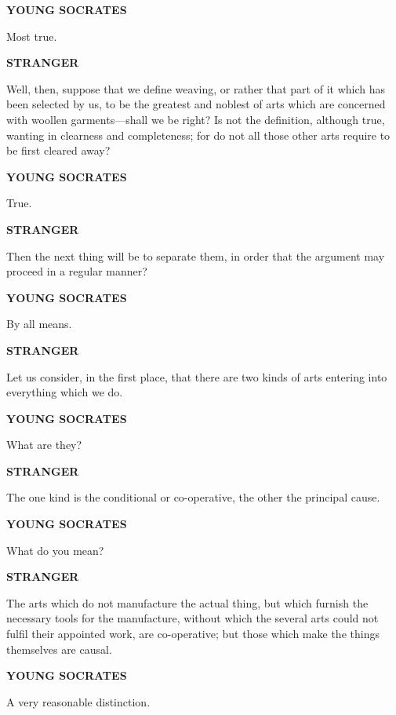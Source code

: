 \documentclass[11pt,letter]{article}
\begin{document}
\par \textbf{YOUNG SOCRATES}
\par   Most true.

\par \textbf{STRANGER}
\par   Well, then, suppose that we define weaving, or rather that part of it which has been selected by us, to be the greatest and noblest of arts which are concerned with woollen garments—shall we be right? Is not the definition, although true, wanting in clearness and completeness; for do not all those other arts require to be first cleared away?

\par \textbf{YOUNG SOCRATES}
\par   True.

\par \textbf{STRANGER}
\par   Then the next thing will be to separate them, in order that the argument may proceed in a regular manner?

\par \textbf{YOUNG SOCRATES}
\par   By all means.

\par \textbf{STRANGER}
\par   Let us consider, in the first place, that there are two kinds of arts entering into everything which we do.

\par \textbf{YOUNG SOCRATES}
\par   What are they?

\par \textbf{STRANGER}
\par   The one kind is the conditional or co-operative, the other the principal cause.

\par \textbf{YOUNG SOCRATES}
\par   What do you mean?

\par \textbf{STRANGER}
\par   The arts which do not manufacture the actual thing, but which furnish the necessary tools for the manufacture, without which the several arts could not fulfil their appointed work, are co-operative; but those which make the things themselves are causal.

\par \textbf{YOUNG SOCRATES}
\par   A very reasonable distinction.
\end{document}
